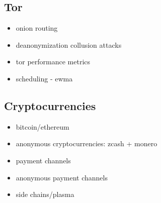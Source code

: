 \subsection{Tor}

\begin{itemize}
\item onion routing
\item deanonymization collusion attacks
\item tor performance  metrics
\item scheduling - ewma
\end{itemize}

\subsection{Cryptocurrencies}

\begin{itemize}
\item bitcoin/ethereum~\cite{nakamoto2008bitcoin}~\cite{wood2014ethereum}
\item anonymous cryptocurrencies: zcash + monero
\item payment channels
\item anonymous payment channels
\item side chains/plasma
\end{itemize}